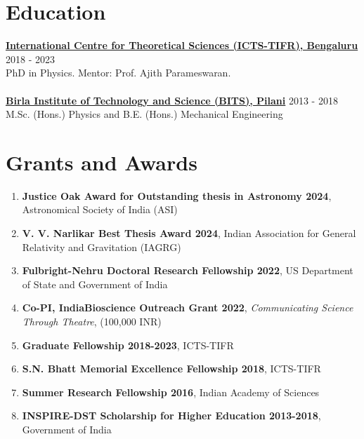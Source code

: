 			
		
		\section{Education}
		\textbf{\href{https://www.icts.res.in/}{International Centre for Theoretical Sciences (ICTS-TIFR), Bengaluru}} \hfill 2018 - 2023\\
            PhD in Physics. {Mentor: Prof. Ajith Parameswaran}.\\
             \\
            \textbf{\href{http://www.bits-pilani.ac.in/}{Birla Institute of Technology and Science (BITS), Pilani}} \hfill 2013 - 2018\\
		{M.Sc. (Hons.) Physics and B.E. (Hons.) Mechanical Engineering}

	\section{Grants and Awards}
		\begin{enumerate}[leftmargin=*]
            \item \textbf{Justice Oak Award for Outstanding thesis in Astronomy 2024}, Astronomical Society of India (ASI)
            \item \textbf{V. V. Narlikar Best Thesis Award 2024}, {Indian Association for General Relativity and Gravitation (IAGRG)}
			\item  \textbf{Fulbright-Nehru Doctoral Research Fellowship 2022}, US Department of State and Government of India
            \item \textbf{Co-PI, IndiaBioscience Outreach Grant 2022}, \textit{Communicating Science Through Theatre},  (100,000 INR)
			\item \textbf{Graduate Fellowship 2018-2023}, ICTS-TIFR
			\item \textbf{S.N. Bhatt Memorial Excellence Fellowship 2018}, ICTS-TIFR
			\item \textbf{Summer Research Fellowship 2016},  Indian Academy of Sciences
			\item \textbf{INSPIRE-DST Scholarship for Higher Education 2013-2018}, Government of India
		\end{enumerate}

